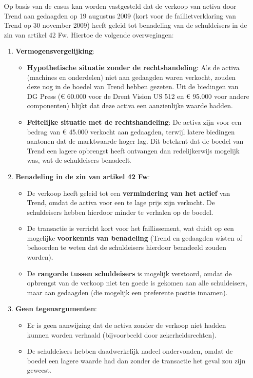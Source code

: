 \documentclass[
  dutch,
  a4paper,
]{article}
\providecommand{\tightlist}{%
  \setlength{\itemsep}{0pt}\setlength{\parskip}{0pt}}
\begin{document}
Op basis van de casus kan worden vastgesteld dat de verkoop van activa door Trend aan gedaagden op 19 augustus 2009 (kort voor de faillietverklaring van Trend op 30 november 2009) heeft geleid tot benadeling van de schuldeisers in de zin van artikel 42 Fw. Hiertoe de volgende overwegingen:

\begin{enumerate}
\def\labelenumi{\arabic{enumi}.}
\tightlist
\item
  \textbf{Vermogensvergelijking}:

  \begin{itemize}
  \tightlist
  \item
    \textbf{Hypothetische situatie zonder de rechtshandeling}: Als de activa (machines en onderdelen) niet aan gedaagden waren verkocht, zouden deze nog in de boedel van Trend hebben gezeten. Uit de biedingen van DG Press (€ 60.000 voor de Drent Vision US 512 en € 95.000 voor andere componenten) blijkt dat deze activa een aanzienlijke waarde hadden.
  \item
    \textbf{Feitelijke situatie met de rechtshandeling}: De activa zijn voor een bedrag van € 45.000 verkocht aan gedaagden, terwijl latere biedingen aantonen dat de marktwaarde hoger lag. Dit betekent dat de boedel van Trend een lagere opbrengst heeft ontvangen dan redelijkerwijs mogelijk was, wat de schuldeisers benadeelt.
  \end{itemize}
\item
  \textbf{Benadeling in de zin van artikel 42 Fw}:

  \begin{itemize}
  \tightlist
  \item
    De verkoop heeft geleid tot een \textbf{vermindering van het actief} van Trend, omdat de activa voor een te lage prijs zijn verkocht. De schuldeisers hebben hierdoor minder te verhalen op de boedel.
  \item
    De transactie is verricht kort voor het faillissement, wat duidt op een mogelijke \textbf{voorkennis van benadeling} (Trend en gedaagden wisten of behoorden te weten dat de schuldeisers hierdoor benadeeld zouden worden).
  \item
    De \textbf{rangorde tussen schuldeisers} is mogelijk verstoord, omdat de opbrengst van de verkoop niet ten goede is gekomen aan alle schuldeisers, maar aan gedaagden (die mogelijk een preferente positie innamen).
  \end{itemize}
\item
  \textbf{Geen tegenargumenten}:

  \begin{itemize}
  \tightlist
  \item
    Er is geen aanwijzing dat de activa zonder de verkoop niet hadden kunnen worden verhaald (bijvoorbeeld door zekerheidsrechten).
  \item
    De schuldeisers hebben daadwerkelijk nadeel ondervonden, omdat de boedel een lagere waarde had dan zonder de transactie het geval zou zijn geweest.
  \end{itemize}
\end{enumerate}
\end{document}
